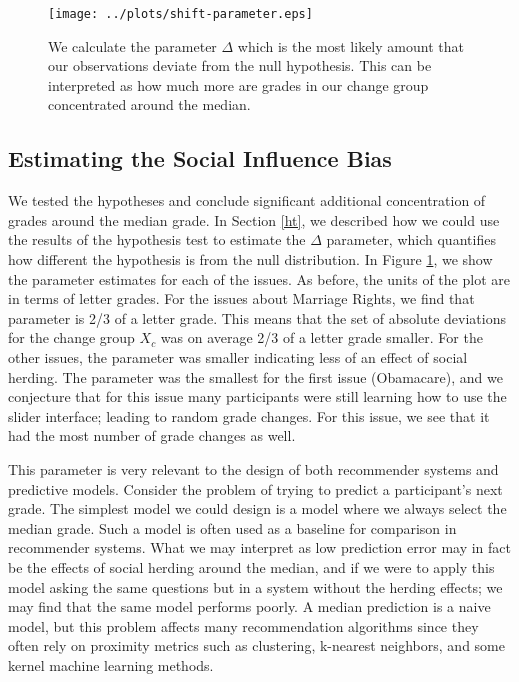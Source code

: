 \begin{figure}[ht!]
\centering
  \hspace{-3em}
    \texttt{[image: ../plots/shift-parameter.eps]}
      \caption{We calculate the parameter $\Delta$ which is the most likely amount that our observations deviate from the null hypothesis. This can be interpreted as how much more are grades in our change group concentrated around the median.}
      \label{shift-1}
\end{figure}
\subsection{Estimating the Social Influence Bias}
We tested the hypotheses and conclude significant additional concentration of grades around the median grade.
In Section \ref{ht}, we described how we could use the results of the hypothesis test to estimate the $\Delta$ parameter, which quantifies how different the hypothesis is from the null distribution.
In Figure \ref{shift-1}, we show the parameter estimates for each of the issues.
As before, the units of the plot are in terms of letter grades.
For the issues about Marriage Rights, we find that parameter is 2/3 of a letter grade.
This means that the set of absolute deviations for the change group $X_c$ was on average 2/3 of a letter grade smaller.
For the other issues, the parameter was smaller indicating less of an effect of social herding.
The parameter was the smallest for the first issue (Obamacare), and we conjecture that for this issue many participants were still learning how to use the slider interface; leading to random grade changes.
For this issue, we see that it had the most number of grade changes as well.

This parameter is very relevant to the design of both recommender systems and predictive models.
Consider the problem of trying to predict a participant's next grade.
The simplest model we could design is a model where we always select the median grade.
Such a model is often used as a baseline for comparison in recommender systems.
What we may interpret as low prediction error may in fact be the effects of social herding around the median, and if we were to apply this model asking the same questions but in a system without the herding effects; we may find that the same model performs poorly.
A median prediction is a naive model, but this problem affects many recommendation algorithms since they often rely on proximity metrics such as clustering, k-nearest neighbors, and some kernel machine learning methods.
